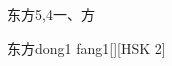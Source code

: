 \begin{entry}{东方}{5,4}{⼀、⽅}
  \begin{phonetics}{东方}{dong1 fang1}[][HSK 2]
  \end{phonetics}
\end{entry}
